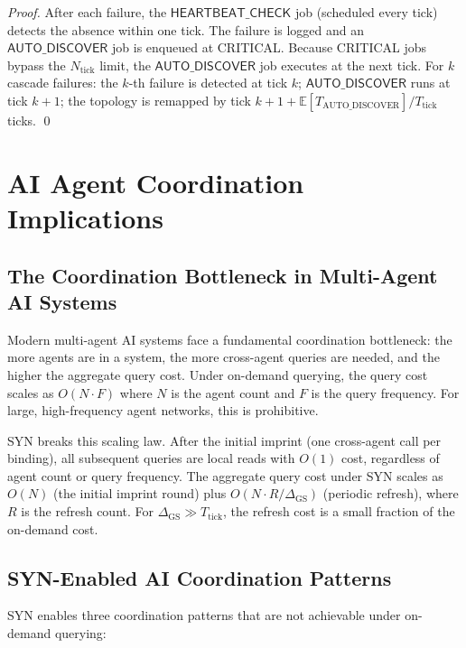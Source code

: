 \documentclass[12pt]{article}
\begin{document}
\begin{proof}
  After each failure, the $\mathsf{HEARTBEAT\_CHECK}$ job (scheduled every tick)
  detects the absence within one tick.  The failure is logged and an
  $\mathsf{AUTO\_DISCOVER}$ job is enqueued at CRITICAL.  Because CRITICAL jobs
  bypass the $N_\text{tick}$ limit, the $\mathsf{AUTO\_DISCOVER}$ job executes
  at the next tick.  For $k$ cascade failures: the $k$-th failure is detected
  at tick $k$; $\mathsf{AUTO\_DISCOVER}$ runs at tick $k+1$; the topology is
  remapped by tick $k+1 + \mathbb{E}[T_\text{AUTO\_DISCOVER}] / T_\text{tick}$
  ticks.  \qed
\end{proof}

\section{AI Agent Coordination Implications}
\label{sec:ai}

\subsection{The Coordination Bottleneck in Multi-Agent AI Systems}

Modern multi-agent AI systems face a fundamental coordination bottleneck: the
more agents are in a system, the more cross-agent queries are needed, and the
higher the aggregate query cost.  Under on-demand querying, the query cost
scales as $O(N \cdot F)$ where $N$ is the agent count and $F$ is the query
frequency.  For large, high-frequency agent networks, this is prohibitive.

SYN breaks this scaling law.  After the initial imprint (one cross-agent call
per binding), all subsequent queries are local reads with $O(1)$ cost,
regardless of agent count or query frequency.  The aggregate query cost under
SYN scales as $O(N)$ (the initial imprint round) plus $O(N \cdot R / \Delta_\text{GS})$
(periodic refresh), where $R$ is the refresh count.  For $\Delta_\text{GS} \gg T_\text{tick}$,
the refresh cost is a small fraction of the on-demand cost.

\subsection{SYN-Enabled AI Coordination Patterns}

SYN enables three coordination patterns that are not achievable under on-demand
querying:
\end{document}

